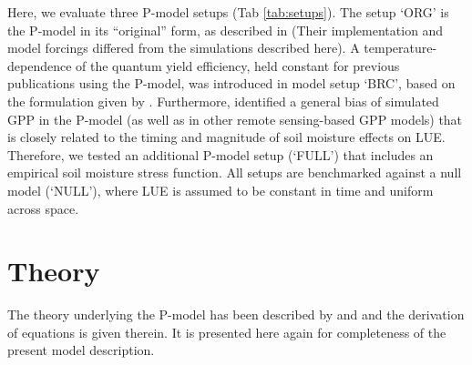 \documentclass{myreport}
\begin{document}
Here, we evaluate three P-model setups (Tab \ref{tab:setups}). The setup `ORG' is the P-model in its ``original'' form, as described in \citet{wang17natpl} (Their implementation and model forcings differed from the simulations described here). A temperature-dependence of the quantum yield efficiency, held constant for previous publications using the P-model, was introduced in model setup `BRC', based on the formulation given by \citet{bernacchi03pce}. Furthermore, \citet{stocker19natgeo} identified a general bias of simulated GPP in the P-model (as well as in other remote sensing-based GPP models) that is closely related to the timing and magnitude of soil moisture effects on LUE. Therefore, we tested an additional P-model setup (`FULL') that includes an empirical soil moisture stress function. All setups are benchmarked against a null model (`NULL'), where LUE is assumed to be constant in time and uniform across space. %


\section{Theory}
\label{sec:theory}

The theory underlying the P-model has been described by \citet{prentice14ecollett} and \citet{wang17natpl} and the derivation of equations is given therein. It is presented here again for completeness of the present model description.
\end{document}

